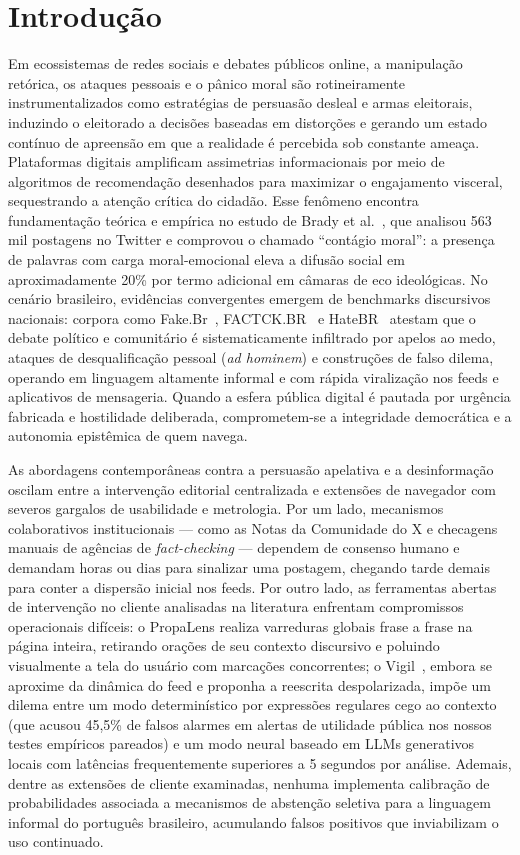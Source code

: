 \documentclass[runningheads]{llncs}
\begin{document}
\section{Introdução}

Em ecossistemas de redes sociais e debates públicos online, a manipulação retórica, os ataques pessoais e o pânico moral são rotineiramente instrumentalizados como estratégias de persuasão desleal e armas eleitorais, induzindo o eleitorado a decisões baseadas em distorções e gerando um estado contínuo de apreensão em que a realidade é percebida sob constante ameaça. Plataformas digitais amplificam assimetrias informacionais por meio de algoritmos de recomendação desenhados para maximizar o engajamento visceral, sequestrando a atenção crítica do cidadão. Esse fenômeno encontra fundamentação teórica e empírica no estudo de Brady et al.~\cite{brady2017emotion}, que analisou 563 mil postagens no Twitter e comprovou o chamado ``contágio moral'': a presença de palavras com carga moral-emocional eleva a difusão social em aproximadamente 20\% por termo adicional em câmaras de eco ideológicas. No cenário brasileiro, evidências convergentes emergem de benchmarks discursivos nacionais: corpora como Fake.Br~\cite{monteiro2018contributions}, FACTCK.BR~\cite{filho2019factck} e HateBR~\cite{vargas2022hatebr} atestam que o debate político e comunitário é sistematicamente infiltrado por apelos ao medo, ataques de desqualificação pessoal (\textit{ad hominem}) e construções de falso dilema, operando em linguagem altamente informal e com rápida viralização nos feeds e aplicativos de mensageria. Quando a esfera pública digital é pautada por urgência fabricada e hostilidade deliberada, comprometem-se a integridade democrática e a autonomia epistêmica de quem navega.

As abordagens contemporâneas contra a persuasão apelativa e a desinformação oscilam entre a intervenção editorial centralizada e extensões de navegador com severos gargalos de usabilidade e metrologia. Por um lado, mecanismos colaborativos institucionais --- como as Notas da Comunidade do X e checagens manuais de agências de \textit{fact-checking} --- dependem de consenso humano e demandam horas ou dias para sinalizar uma postagem, chegando tarde demais para conter a dispersão inicial nos feeds. Por outro lado, as ferramentas abertas de intervenção no cliente analisadas na literatura enfrentam compromissos operacionais difíceis: o PropaLens realiza varreduras globais frase a frase na página inteira, retirando orações de seu contexto discursivo e poluindo visualmente a tela do usuário com marcações concorrentes; o Vigil~\cite{kang2026vigil}, embora se aproxime da dinâmica do feed e proponha a reescrita despolarizada, impõe um dilema entre um modo determinístico por expressões regulares cego ao contexto (que acusou 45,5\% de falsos alarmes em alertas de utilidade pública nos nossos testes empíricos pareados) e um modo neural baseado em LLMs generativos locais com latências frequentemente superiores a 5 segundos por análise. Ademais, dentre as extensões de cliente examinadas, nenhuma implementa calibração de probabilidades associada a mecanismos de abstenção seletiva para a linguagem informal do português brasileiro, acumulando falsos positivos que inviabilizam o uso continuado.
\end{document}
